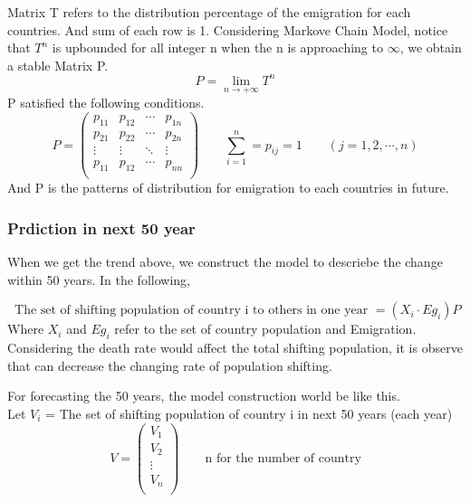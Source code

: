 \documentclass{mcmthesis}
\begin{document}
Matrix T refers to the distribution percentage of the emigration for each countries.
And sum of each row is 1. Considering Markove Chain Model, notice that $T^n$ is upbounded for all integer n when
the n is approaching to $\infty$, we obtain a stable Matrix P.
\begin{displaymath}
P=\lim_{n \to +\infty}T^n
\end{displaymath}
P satisfied the following conditions.
\begin{displaymath}
P=
  \begin{pmatrix}
  {p_{11} } & {p_{12} } & \cdots &{p_{1n} }  \\
  {p_{21} } & {p_{22} } & \cdots & {p_{2n} }  \\
  {\vdots } &  {\vdots }  & \ddots &   \vdots \\
  {p_{11} } & {p_{12} } & \cdots &{p_{nn} }  \\
  \end{pmatrix}
  \qquad \sum^n_{i=1}=p_{ij}=1 \qquad (j=1,2,\cdots,n)
\end{displaymath}
\qquad And P is the patterns of distribution for emigration to each countries in future.

\subsubsection{Prdiction in next 50 year}
When we get the trend above, we construct the model to descriebe the change within 50 years.
In the following,

\begin{equation}
 \text{ The set of shifting population of country i to others in one year }= (X_{i} \cdot Eg_{i})P
\end{equation}
Where $X_{i}$ and $ Eg_{i}$ refer to the set of country population and Emigration.
Considering the death rate would affect the total shifting population,  it is observe that can decrease the changing rate of population shifting.

For forecasting the 50 years, the model construction world be like this.\\
Let $V_i$ = The set of shifting population of country i in next 50 years (each year) 
\begin{displaymath}
V=\begin{pmatrix}
  {V_{1} }  \\
  {V_{2} }  \\
  {\vdots } \\
  {V_{n} }  \\
  \end{pmatrix}
\qquad  \text {n for the number of country}
\end{displaymath}
\end{document}
